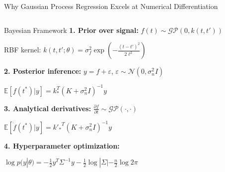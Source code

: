 \documentclass[aspectratio=169]{beamer}
\begin{document}
\begin{frame}{Why Gaussian Process Regression Excels at Numerical Differentiation}
  
  \begin{columns}[t]
    
    \begin{column}{0.48\textwidth}
      \vspace{-0.5em}
      \begin{block}{\small Bayesian Framework}
        \tiny
        \textbf{1. Prior over signal:} $f(t) \sim \mathcal{GP}(0, k(t,t'))$
        
        RBF kernel: $k(t,t'; \theta) = \sigma_f^2 \exp\left(-\frac{(t-t')^2}{2\ell^2}\right)$
        
        \vspace{0.3em}
        \textbf{2. Posterior inference:} $y = f + \varepsilon$, $\varepsilon \sim \mathcal{N}(0, \sigma_n^2 I)$
        
        $\mathbb{E}[f(t^*)|y] = k_*^T (K + \sigma_n^2 I)^{-1} y$
        
        \vspace{0.3em}
        \textbf{3. Analytical derivatives:} $\frac{\partial f}{\partial t} \sim \mathcal{GP}(\cdot, \cdot)$
        
        $\mathbb{E}[\dot{f}(t^*)|y] = {k'_*}^T (K + \sigma_n^2 I)^{-1} y$
        
        \vspace{0.3em}
        \textbf{4. Hyperparameter optimization:}
        
        $\log p(y|\theta) = -\frac{1}{2}y^T \Sigma^{-1} y - \frac{1}{2}\log|\Sigma| - \frac{n}{2}\log 2\pi$
      \end{block}
      
      \vspace{0.5em}
      \begin{center}
      \end{center}
    \end{column}
    

\end{columns}
\end{frame}
\end{document}
